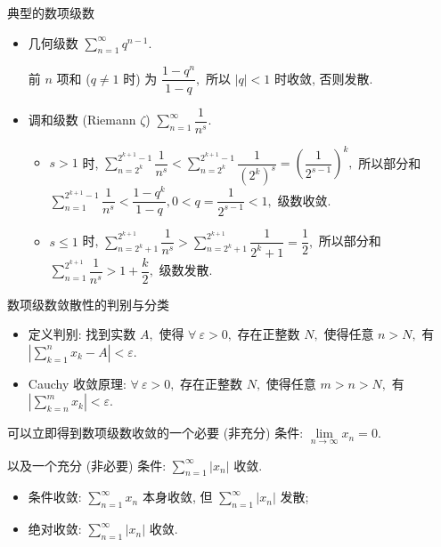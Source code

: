 \begin{frame}{典型的数项级数}

\begin{itemize}[<+->]
\item 几何级数 $\sum\limits_{n=1}^\infty q^{n-1}.$ \par
前 $n$ 项和 ($q \neq 1$ 时) 为 $\dfrac{1-q^n}{1-q},$ 所以 $\lvert q \rvert < 1$ 时收敛, 否则发散.
\item 调和级数 (Riemann $\zeta$) $\sum\limits_{n=1}^\infty \dfrac{1}{n^s}.$
\begin{itemize}
\item $s > 1$ 时, $\sum\limits_{n=2^k}^{2^{k+1}-1} \dfrac{1}{n^s} < \sum\limits_{n=2^k}^{2^{k+1}-1} \dfrac{1}{(2^k)^s} = \left(\dfrac{1}{2^{s-1}}\right)^k,$ 所以部分和 $\sum\limits_{n=1}^{2^{k+1}-1} \dfrac{1}{n^s} < \dfrac{1-q^k}{1-q}, 0 < q = \dfrac{1}{2^{s-1}} < 1,$ 级数收敛.
\item $s \leqslant 1$ 时, $\sum\limits_{n=2^k+1}^{2^{k+1}} \dfrac{1}{n^s} > \sum\limits_{n=2^k+1}^{2^{k+1}} \dfrac{1}{2^k+1} = \dfrac{1}{2},$ 所以部分和 $\sum\limits_{n=1}^{2^{k+1}} \dfrac{1}{n^s} > 1 + \dfrac{k}{2},$ 级数发散.
\end{itemize}
\end{itemize}

\end{frame}


\begin{frame}{数项级数敛散性的判别与分类}

\begin{itemize}
\item 定义判别: 找到实数 $A,$ 使得 $\forall~\varepsilon > 0,$ 存在正整数 $N,$ 使得任意 $n > N,$ 有 $\left\lvert \sum\limits_{k=1}^n x_k - A \right\rvert < \varepsilon.$
\pause
\item Cauchy 收敛原理: $\forall~\varepsilon > 0,$ 存在正整数 $N,$ 使得任意 $m > n > N,$ 有 $\left\lvert \sum\limits_{k=n}^m x_k \right\rvert < \varepsilon.$
\end{itemize}

\pause

可以立即得到数项级数收敛的一个必要 (非充分) 条件: $\lim\limits_{n\to\infty} x_n = 0.$

\pause

以及一个充分 (非必要) 条件: $\sum\limits_{n=1}^\infty \lvert x_n \rvert$ 收敛.

\pause

\begin{Def}
\begin{itemize}[<+->]
\item 条件收敛: $\sum\limits_{n=1}^\infty x_n$ 本身收敛, 但 $\sum\limits_{n=1}^\infty \lvert x_n \rvert$ 发散;
\item 绝对收敛: $\sum\limits_{n=1}^\infty \lvert x_n \rvert$ 收敛.
\end{itemize}
\end{Def}

\end{frame}

